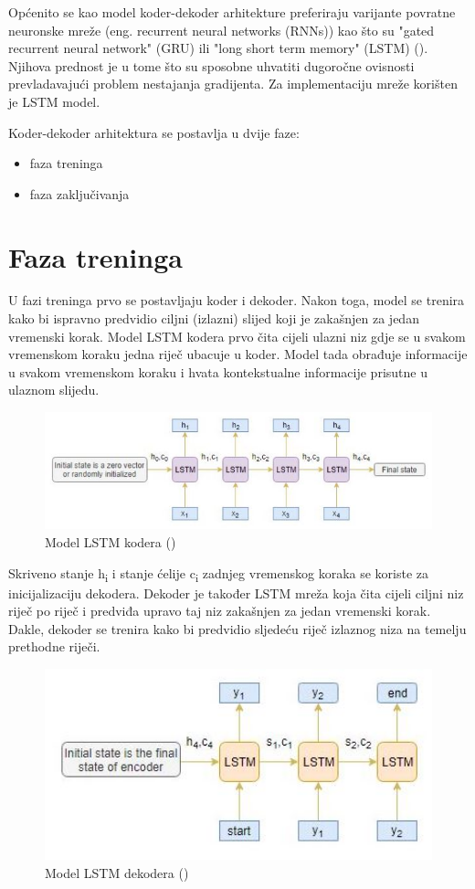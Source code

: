 \documentclass[times, utf8, zavrsni, numeric]{fer}
\begin{document}
Općenito se kao model koder-dekoder arhitekture preferiraju varijante povratne neuronske mreže (eng. recurrent neural networks (RNNs)) kao što su "gated recurrent neural network" (GRU) ili "long short term memory" (LSTM) (\citet{article3}).
Njihova prednost je u tome što su sposobne uhvatiti dugoročne ovisnosti prevladavajući problem nestajanja gradijenta.
Za implementaciju mreže korišten je LSTM model.
\par Koder-dekoder arhitektura se postavlja u dvije faze:
\begin{itemize}
    \item faza treninga
    \item faza zaključivanja
\end{itemize}

\section{Faza treninga}
U fazi treninga prvo se postavljaju koder i dekoder. Nakon toga, model se trenira kako bi ispravno predvidio ciljni (izlazni) slijed koji je zakašnjen za jedan vremenski korak.
Model LSTM kodera prvo čita cijeli ulazni niz gdje se u svakom vremenskom koraku jedna riječ ubacuje u koder.
Model tada obrađuje informacije u svakom vremenskom koraku i hvata kontekstualne informacije prisutne u ulaznom slijedu.
\begin{figure}[htb]
\centering
\includegraphics[width=15cm]{img/LSTM-encoder.jpg}
\caption{Model LSTM kodera (\citet{article3})}
\label{fig:LSTM-encoder}
\end{figure}
Skriveno stanje h\textsubscript{i} i stanje ćelije c\textsubscript{i} zadnjeg vremenskog koraka se koriste za inicijalizaciju dekodera.
Dekoder je također LSTM mreža koja čita cijeli ciljni niz riječ po riječ i predviđa upravo taj niz zakašnjen za jedan vremenski korak.
Dakle, dekoder se trenira kako bi predvidio sljedeću riječ izlaznog niza na temelju prethodne riječi.
\begin{figure}[htb]
\centering
\includegraphics[width=15cm]{img/LSTM-decoder.jpg}
\caption{Model LSTM dekodera (\citet{article3})}
\label{fig:LSTM-decoder}
\end{figure}
\end{document}
